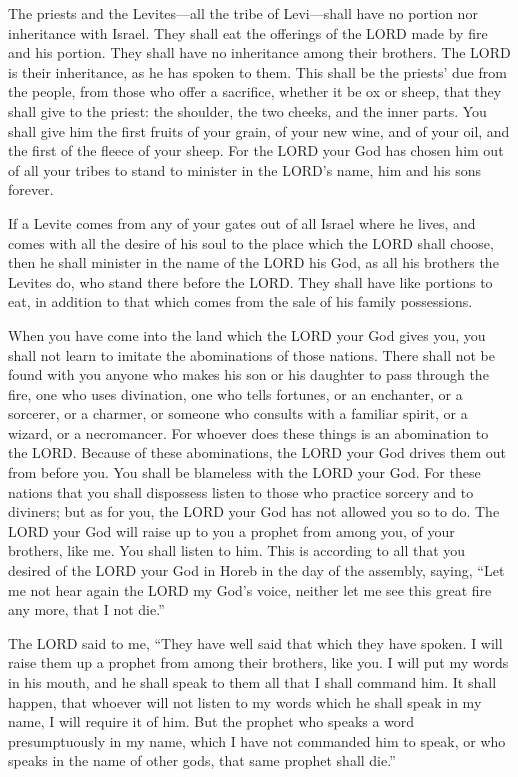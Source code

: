 \mychapter{} \myverse*{}The priests and the Levites—all the tribe of Levi—shall have no
portion nor inheritance with Israel. They shall eat the offerings of the LORD made by fire and his portion.
\myverse{}They shall have no inheritance among their brothers. The LORD is their inheritance,
as he has spoken to them.
\myverse{}This shall be the priests’ due from the people, from those who offer a sacrifice,
whether it be ox or sheep, that they shall give to the priest: the shoulder, the two cheeks, and the inner
parts.
\myverse{}You shall give him the first fruits of your grain, of your new wine, and of
your oil, and the first of the fleece of your sheep.
\myverse{}For the LORD your God has chosen him out of all your tribes to stand to minister
in the LORD’s name, him and his sons forever.


\myverse{}If a Levite comes from any of your gates out of all Israel where
he lives, and comes with all the desire of his soul to the place which the LORD shall choose,
\myverse{}then he shall minister in the name of the LORD his God, as all his brothers
the Levites do, who stand there before the LORD.
\myverse{}They shall have like portions to eat, in addition to that which comes from
the sale of his family possessions.


\myverse{}When you have come into the land which the LORD your God gives
you, you shall not learn to imitate the abominations of those nations.
\myverse{}There shall not be found with you anyone who makes his son or his daughter
to pass through the fire, one who uses divination, one who tells fortunes, or an enchanter, or a sorcerer,
\myverse{}or a charmer, or someone who consults with a familiar spirit, or a wizard,
or a necromancer.
\myverse{}For whoever does these things is an abomination to the LORD. Because of these
abominations, the LORD your God drives them out from before you.
\myverse{}You shall be blameless with the LORD your God.
\myverse{}For these nations that you shall dispossess listen to those who practice
sorcery and to diviners; but as for you, the LORD your God has not allowed you so to do.
\myverse{}The LORD your God will raise up to you a prophet from among you, of your
brothers, like me. You shall listen to him.
\myverse{}This is according to all that you desired of the LORD your God in Horeb in
the day of the assembly, saying, “Let me not hear again the LORD my God’s voice, neither let me see this
great fire any more, that I not die.”


\myverse{}The LORD said to me, “They have well said that which they have
spoken.
\myverse{}I will raise them up a prophet from among their brothers, like you. I will
put my words in his mouth, and he shall speak to them all that I shall command him.
\myverse{}It shall happen, that whoever will not listen to my words which he shall
speak in my name, I will require it of him.
\myverse{}But the prophet who speaks a word presumptuously in my name, which I have
not commanded him to speak, or who speaks in the name of other gods, that same prophet shall die.”


